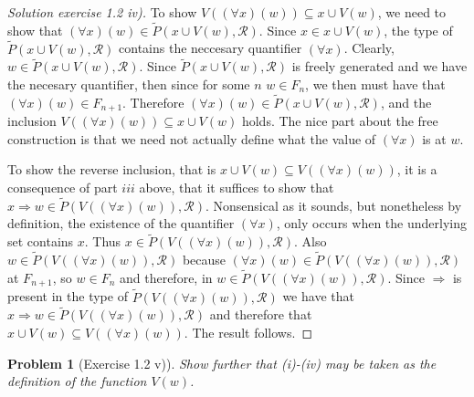 \documentclass{article}
\theoremstyle{problemstyle}
\newtheorem{problem}{Problem}
\begin{document}
\begin{proof}[Solution exercise 1.2 iv)]
To show $V((\forall x)(w)) \subseteq {x} \cup V(w)$, we need to show that $(\forall x)(w) \in \widetilde{P}({x} \cup V(w),\mathscr{R})$. Since $x \in {x} \cup V(w)$, the type of $\widetilde{P}({x} \cup V(w),\mathscr{R})$ contains the neccesary quantifier $(\forall x)$. Clearly, $w \in \widetilde{P}({x} \cup V(w),\mathscr{R})$. Since $\widetilde{P}({x} \cup V(w),\mathscr{R})$ is freely generated and we have the necesary quantifier, then since for some $n$ $w \in F_n$, we then must have that $(\forall x)(w) \in F_{n+1}$. Therefore $(\forall x)(w) \in \widetilde{P}({x} \cup V(w),\mathscr{R})$, and the inclusion $V((\forall x)(w)) \subseteq {x} \cup V(w)$ holds. The nice part about the free construction is that we need not actually define what the value of $(\forall x)$ is at $w$. 

To show the reverse inclusion, that is ${x} \cup V(w) \subseteq V((\forall x)(w))$, it is a consequence of part $iii$ above, that it suffices to show that $x \Rightarrow w \in \widetilde{P}(V((\forall x)(w)), \mathscr{R})$. Nonsensical as it sounds, but nonetheless by definition, the existence of the quantifier $(\forall x)$, only occurs when the underlying set contains $x$. Thus $x \in \widetilde{P}(V((\forall x)(w)), \mathscr{R})$. Also $w \in \widetilde{P}(V((\forall x)(w)), \mathscr{R})$ because $(\forall x)(w) \in \widetilde{P}(V((\forall x)(w)), \mathscr{R})$ at $F_{n+1}$, so $w \in F_{n}$ and therefore, in $w \in \widetilde{P}(V((\forall x)(w)), \mathscr{R})$. Since $\Rightarrow$ is present in the type of $\widetilde{P}(V((\forall x)(w)), \mathscr{R})$ we have that $x \Rightarrow w \in \widetilde{P}(V((\forall x)(w)), \mathscr{R})$ and therefore that ${x} \cup V(w) \subseteq V((\forall x)(w))$. The result follows. 
\end{proof}

\begin{problem}[Exercise 1.2 v)] 
Show further that (i)-(iv) may be taken as the definition of the function $V(w)$.
\end{problem}
\end{document}
